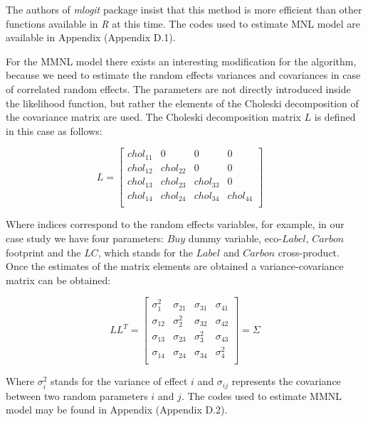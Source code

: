 \documentclass[11pt,]{article}
\begin{document}
The authors of \emph{mlogit} package insist that this method is more
efficient than other functions available in \emph{R} at this time. The
codes used to estimate MNL model are available in Appendix (Appendix
D.1).

For the MMNL model there exists an interesting modification for the
algorithm, because we need to estimate the random effects variances and
covariances in case of correlated random effects. The parameters are not
directly introduced inside the likelihood function, but rather the
elements of the Choleski decomposition of the covariance matrix are
used. The Choleski decomposition matrix \(L\) is defined in this case as
follows:

\begin{equation}
L=
    \begin{bmatrix} 
    chol_{11}  & 0         & 0     & 0 \\
    chol_{12}  & chol_{22}    & 0     & 0 \\
    chol_{13}  & chol_{23}    & chol_{33}& 0 \\
    chol_{14}  & chol_{24}    & chol_{34}& chol_{44} \\
    \end{bmatrix}
\quad
\end{equation}

Where indices correspond to the random effects variables, for example,
in our case study we have four parameters: \(Buy\) dummy variable,
eco-\(Label\), \(Carbon\) footprint and the \(LC\), which stands for the
\(Label\) and \(Carbon\) cross-product. Once the estimates of the matrix
elements are obtained a variance-covariance matrix can be obtained:

\begin{equation}
LL^T = 
    \begin{bmatrix} 
    \sigma_{1} ^2  & \sigma_{21}   & \sigma_{31}   & \sigma_{41} \\
    \sigma_{12}     & \sigma_{2}^2 & \sigma_{32}   & \sigma_{42} \\
    \sigma_{13}     & \sigma_{23}   & \sigma_{3}^2 & \sigma_{43} \\
    \sigma_{14}     & \sigma_{24}   & \sigma_{34}   & \sigma_{4}^2 \\
    \end{bmatrix}
= \Sigma
\end{equation}

Where \(\sigma_{i}^2\) stands for the variance of effect \(i\) and
\(\sigma_{ij}\) represents the covariance between two random parameters
\(i\) and \(j\). The codes used to estimate MMNL model may be found in
Appendix (Appendix D.2).
\end{document}
